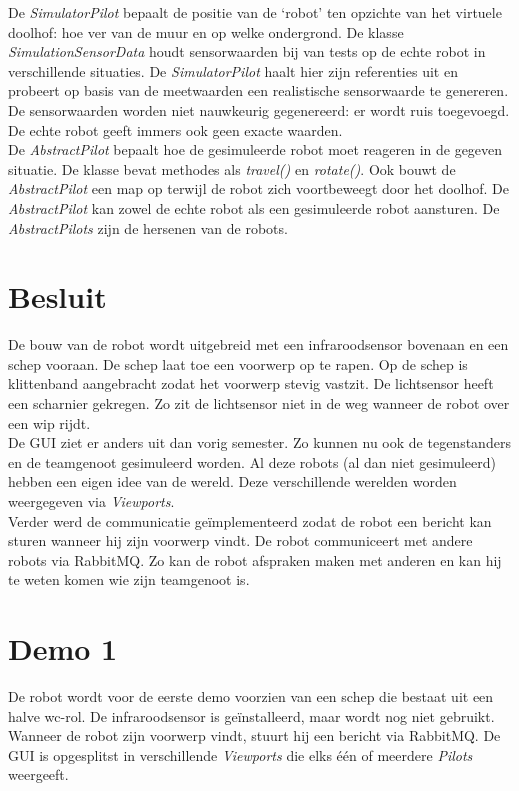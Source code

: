 \documentclass[tt2]{penoverslag}
\begin{document}
De \textit{SimulatorPilot} bepaalt de positie van de `robot' ten opzichte van het virtuele doolhof: hoe ver van de muur en op welke ondergrond. De klasse \textit{SimulationSensorData} houdt sensorwaarden bij van tests op de echte robot in verschillende situaties. De \textit{SimulatorPilot} haalt hier zijn referenties uit en probeert op basis van de meetwaarden een realistische sensorwaarde te genereren. De sensorwaarden worden niet nauwkeurig gegenereerd: er wordt ruis toegevoegd. De echte robot geeft immers ook geen exacte waarden.\\

De \textit{AbstractPilot} bepaalt hoe de gesimuleerde robot moet reageren in de gegeven situatie. De klasse bevat methodes als \textit{travel()} en \textit{rotate()}. Ook bouwt de \textit{AbstractPilot} een map op terwijl de robot zich voortbeweegt door het doolhof. De \textit{AbstractPilot} kan zowel de echte robot als een gesimuleerde robot aansturen. De \textit{AbstractPilots} zijn de hersenen van de robots.


\section{Besluit}
De bouw van de robot wordt uitgebreid met een infraroodsensor bovenaan en een schep vooraan. De schep laat toe een voorwerp op te rapen. Op de schep is klittenband aangebracht zodat het voorwerp stevig vastzit. De lichtsensor heeft een scharnier gekregen. Zo zit de lichtsensor niet in de weg wanneer de robot over een wip rijdt. \\

De GUI ziet er anders uit dan vorig semester. Zo kunnen nu ook de tegenstanders en de teamgenoot gesimuleerd worden. Al deze robots (al dan niet gesimuleerd) hebben een eigen idee van de wereld. Deze verschillende werelden worden weergegeven via \textit{Viewports}.\\

Verder werd de communicatie ge\"implementeerd zodat de robot een bericht kan sturen wanneer hij zijn voorwerp vindt. 
De robot communiceert met andere robots via RabbitMQ. Zo kan de robot afspraken maken met anderen en kan hij te weten komen wie zijn teamgenoot is.
 


\newpage
\makeappendix

\section{Demo 1} %
\label{Asec:demo1}
De robot wordt voor de eerste demo voorzien van een schep die bestaat uit een halve wc-rol. De infraroodsensor is ge\"installeerd, maar wordt nog niet gebruikt. Wanneer de robot zijn voorwerp vindt, stuurt hij een bericht via RabbitMQ. De GUI is opgesplitst in verschillende \textit{Viewports} die elks \'e\'en of meerdere \textit{Pilots} weergeeft.
\end{document}
